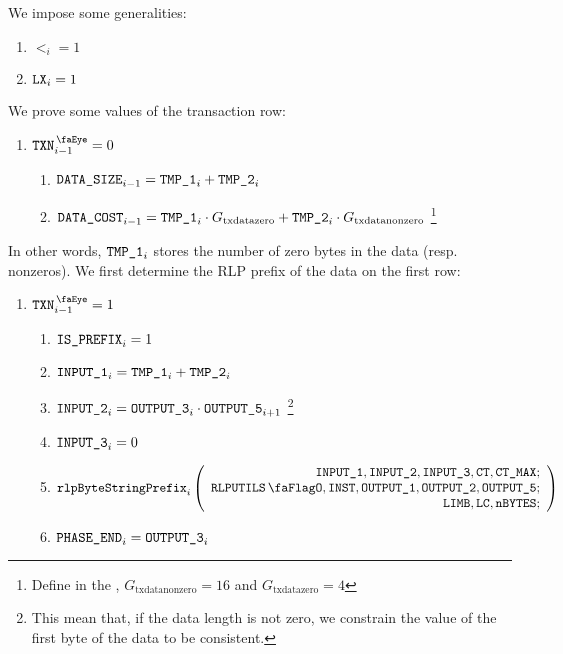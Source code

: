\begin{center}
\end{center}
We impose some generalities:
\begin{enumerate}
	\item $\lt_{i}=1$
	\item $\texttt{LX}_{i}=1$
\end{enumerate}
We prove some values of the transaction row:
\begin{enumerate}[resume]
	\item \If $\isTxn_{i-1}=0$ \Then
		\begin{enumerate}
			\item $\texttt{DATA\_SIZE}_{i-1} = \texttt{TMP\_1}_{i} + \texttt{TMP\_2}_{i}$
			\item $\texttt{DATA\_COST}_{i-1} = \texttt{TMP\_1}_{i} \cdot G_{\mathrm{txdatazero}} + \texttt{TMP\_2}_{i} \cdot G_{\mathrm{txdatanonzero}}$ 
				\footnote{Define in the \cite{EYP-London}, $G_{\mathrm{txdatanonzero}}=16$ and $G_{\mathrm{txdatazero}}=4$}
		\end{enumerate}
\end{enumerate}
In other words, $\texttt{TMP\_1}_{i}$ stores the number of zero bytes in the data (resp. nonzeros). 
\newline
We first determine the RLP prefix of the data on the first row:
\begin{enumerate}[resume]
	\item \If $\isTxn_{i-1}=1$ \Then
		\begin{enumerate}
			\item $\texttt{IS\_PREFIX}_{i} = 1$
			\item $\texttt{INPUT\_1}_{i} = \texttt{TMP\_1}_{i} + \texttt{TMP\_2}_{i}$
			\item $\texttt{INPUT\_2}_{i} = \texttt{OUTPUT\_3}_{i} \cdot \texttt{OUTPUT\_5}_{i+1}$
				\footnote{This mean that, if the data length is not zero, we constrain the value of the first byte of the data to be consistent.}
			\item $\texttt{INPUT\_3}_{i} = 0$ 
			\item 
				\[
					\rlpBytestringPrefix_{i}
					\left(
					\begin{array}{r}
						\inputColumn{1},
						\inputColumn{2},
						\inputColumn{3},
						\ct,
						\maxCt; \\
						\rlpUtilsFlag,
						\INST,
						\resultColumn{1},
						\resultColumn{2},
						\resultColumn{5}; \\
						\limb,
						\lc,
						\limbsize; \\
					\end{array}
					\right)
				\]
			\item $\texttt{PHASE\_END}_{i} = \texttt{OUTPUT\_3}_{i}$
		\end{enumerate}
\end{enumerate}
